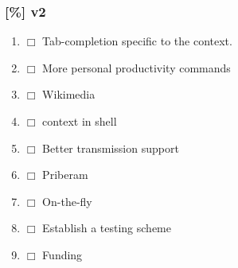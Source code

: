 \documentclass[11pt]{article}
\begin{document}
\subsubsection{[\%] v2}
\label{sec-3.1.1}

\begin{enumerate}
\item $\Box$ Tab-completion specific to the context.
\item $\Box$ More personal productivity commands
\item $\Box$ Wikimedia
\item $\Box$ context in shell
\item $\Box$ Better transmission support
\item $\Box$ Priberam
\item $\Box$ On-the-fly
\item $\Box$ Establish a testing scheme
\item $\Box$ Funding
\end{enumerate}
\end{document}
